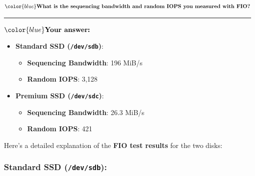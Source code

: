 \documentclass[11pt]{article}
\providecommand{\tightlist}{%
      \setlength{\itemsep}{0pt}\setlength{\parskip}{0pt}}
\begin{document}
\(\color{blue}\textbf{What is the sequencing bandwidth and random IOPS you measured with FIO?}\)

\begin{center}\rule{0.5\linewidth}{0.5pt}\end{center}

\(\color{blue} \textbf{Your answer:}\)

\begin{itemize}
\tightlist
\item
  \textbf{Standard SSD (\texttt{/dev/sdb})}:

  \begin{itemize}
  \tightlist
  \item
    \textbf{Sequencing Bandwidth}: 196 MiB/s\\
  \item
    \textbf{Random IOPS}: 3,128
  \end{itemize}
\item
  \textbf{Premium SSD (\texttt{/dev/sdc})}:

  \begin{itemize}
  \tightlist
  \item
    \textbf{Sequencing Bandwidth}: 26.3 MiB/s\\
  \item
    \textbf{Random IOPS}: 421
  \end{itemize}
\end{itemize}

Here's a detailed explanation of the \textbf{FIO test results} for the
two disks:

\subsubsection{\texorpdfstring{\textbf{Standard SSD
(\texttt{/dev/sdb}):}}{Standard SSD (/dev/sdb):}}\label{standard-ssd-devsdb}
\end{document}
